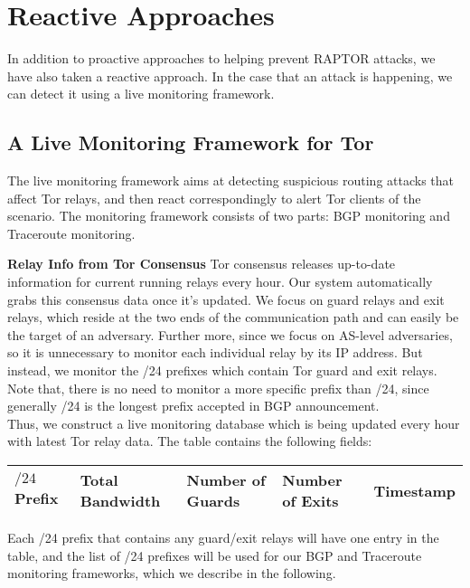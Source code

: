 \section{Reactive Approaches}
In addition to proactive approaches to helping prevent RAPTOR attacks, we have also taken a reactive approach.  In the case that an attack is happening, we can detect it using a live monitoring framework.

\subsection{A Live Monitoring Framework for Tor}
The live monitoring framework aims at detecting suspicious routing attacks that affect Tor relays, and then react correspondingly to alert Tor clients of the scenario. The monitoring framework consists of two parts: BGP monitoring and Traceroute monitoring.

{\bf Relay Info from Tor Consensus} Tor consensus releases up-to-date information for current running relays every hour. Our system automatically grabs this consensus data once it's updated. We focus on guard relays and exit relays, which reside at the two ends of the communication path and can easily be the target of an adversary. Further more, since we focus on AS-level adversaries, so it is unnecessary to monitor each individual relay by its IP address. But instead, we monitor the /24 prefixes which contain Tor guard and exit relays. Note that, there is no need to monitor a more specific prefix than /24, since generally /24 is the longest prefix accepted in BGP announcement. \\
Thus, we construct a live monitoring database which is being updated every hour with latest Tor relay data. The table contains the following fields:
\begin{center}
\begin{tabular}{ p{8mm} | p{1.4cm} | p{1.3cm} | p{1.3cm} | p{1.3cm}}
  \hline			
  $/24$ Prefix & Total Bandwidth & Number of Guards & Number of Exits & Timestamp \\
  \hline  
\end{tabular}
\label{tab:relayinfo}
\end{center}
Each /24 prefix that contains any guard/exit relays will have one entry in the table, and the list of /24 prefixes will be used for our BGP and Traceroute monitoring frameworks, which we describe in the following. 

